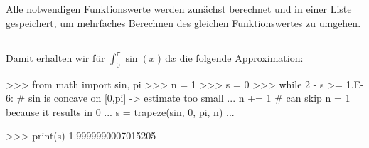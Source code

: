 \section{}





\subsection{}

Alle notwendigen Funktionswerte werden zunächst berechnet und in einer Liste gespeichert, um mehrfaches Berechnen des gleichen Funktionswertes zu umgehen.







\subsection{}

Damit erhalten wir für $\int_0^\pi \sin(x) \,\text{d}x$ die folgende Approximation:

\begin{consoleoutput}
>>> from math import sin, pi
>>> n = 1
>>> s = 0
>>> while 2 - s >= 1.E-6:   # sin is concave on [0,pi] -> estimate too small
...     n += 1              # can skip n = 1 because it results in 0
...     s = trapeze(sin, 0, pi, n)
... 

>>> print(s)
1.9999990007015205
\end{consoleoutput}
